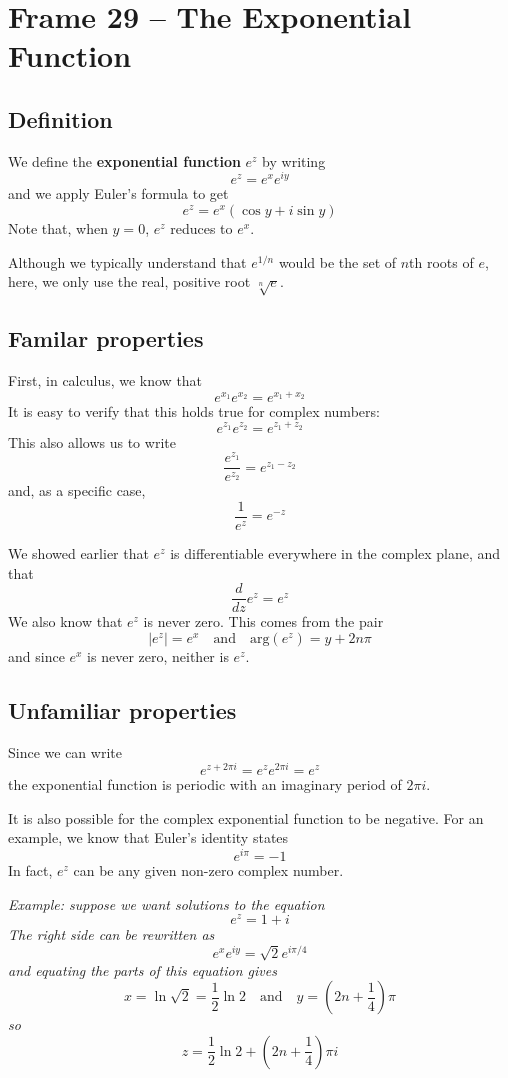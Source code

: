 \documentclass{article}
\renewcommand{\emph}{\textbf}
\begin{document}
\tableofcontents

\clearpage

\section{Frame 29 -- The Exponential Function}
\subsection{Definition}
We define the \emph{exponential function} $e^z$ by writing
\[
	e^z = e^x e^{iy}
\]
and we apply Euler's formula to get
\[
	e^z = e^x (\cos y + i \sin y)
\]
Note that, when $y = 0$, $e^z$ reduces to $e^x$. 

Although we typically understand that $e^{1/n}$ would be the set of $n$th roots of $e$, here, we only use the real, positive root $\sqrt[n]{e}$.

\subsection{Familar properties}
First, in calculus, we know that
\[
	e^{x_1} e^{x_2} = e^{x_1 + x_2}
\]
It is easy to verify that this holds true for complex numbers:
\[
	e^{z_1} e^{z_2} = e^{z_1 + z_2}
\]
This also allows us to write
\[
	\frac{e^{z_1}}{e^{z_2}} = e^{z_1 - z_2}
\]
and, as a specific case,
\[
	\frac{1}{e^{z}} = e^{-z}
\]

We showed earlier that $e^z$ is differentiable everywhere in the complex plane, and that
\[
	\frac{d}{dz} e^z = e^z
\]
We also know that $e^z$ is never zero. This comes from the pair
\[
	|e^z| = e^x	\quad \text{and} \quad	\text{arg}(e^z) = y + 2n\pi
\]
and since $e^x$ is never zero, neither is $e^z$.

\subsection{Unfamiliar properties}
Since we can write
\[
	e^{z + 2\pi i} = e^z e^{2\pi i} = e^z
\]
the exponential function is periodic with an imaginary period of $2\pi i$.

It is also possible for the complex exponential function to be negative. For an example, we know that Euler's identity states
\[
	e^{i\pi} = -1
\]
In fact, $e^z$ can be any given non-zero complex number.

\textit{Example: suppose we want solutions to the equation
\[
	e^z = 1 + i
\]
The right side can be rewritten as
\[
	e^x e^{iy} = \sqrt{2} e^{i\pi / 4}
\]
and equating the parts of this equation gives
\[
	x = \ln \sqrt{2} = \frac{1}{2} \ln 2 \quad	\text{and} \quad 
	y = \left(2n + \frac{1}{4}\right) \pi
\]
so
\[
	z = \frac{1}{2} \ln 2 + \left( 2n + \frac{1}{4} \right) \pi i
\]}
\end{document}
